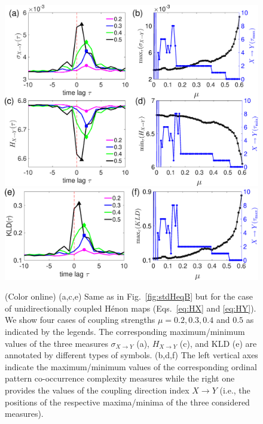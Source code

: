 \documentclass[12pt,aip,cha,reprint,nofootinbib]{revtex4-1}
\begin{document}
\begin{figure}
	\centering
	\includegraphics[width=\columnwidth]{henonMaps.eps}
	\includegraphics[width=\columnwidth]{henon_KL.eps}
\caption{(Color online) (a,c,e) Same as in Fig.~\ref{fig:stdHeqB} but for the case of unidirectionally coupled H\'enon maps (Eqs.~\eqref{eq:HX} and \eqref{eq:HY}). We show four cases of coupling strengths $\mu = 0.2, 0.3, 0.4$ and $0.5$ as indicated by the legends. The corresponding maximum/minimum values of the three measures $\sigma_{X \to Y}$ (a), $H_{X \to Y}$ (c), and $\text{KLD}$ (e) are annotated by different types of symbols. (b,d,f) The left vertical axes indicate the maximum/minimum values of the corresponding ordinal pattern co-occurrence complexity measures while the right one provides the values of the coupling direction index $X \to Y$ (i.e., the positions of the respective maxima/minima of the three considered measures). \label{fig:stdHeqXY}}
\end{figure}
\end{document}
